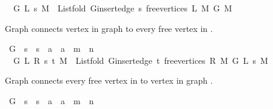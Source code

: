 \begin{isabellebody}
\ \ {\isachardoublequoteopen}G{}{\isacharunderscore}{\kern0pt}{}\ L\ s\ M\ {\isasymequiv}\ List{\isachardot}{\kern0pt}fold\ {\isacharparenleft}{\kern0pt}G{\isachardot}{\kern0pt}insert{\isacharunderscore}{\kern0pt}edge\ s{\isacharparenright}{\kern0pt}\ {\isacharparenleft}{\kern0pt}free{\isacharunderscore}{\kern0pt}vertices\ L\ M{\isacharparenright}{\kern0pt}\ {\isacharparenleft}{\kern0pt}G{}{\isacharunderscore}{\kern0pt}{}\ M{\isacharparenright}{\kern0pt}{\isachardoublequoteclose}%
\begin{isamarkuptext}%
Graph  connects vertex  in graph  to every free vertex in
.%
\end{isamarkuptext}\isamarkuptrue%
\isamarkupfalse%
\ G{}{\isacharunderscore}{\kern0pt}{}\ {\isacharcolon}{\kern0pt}{\isacharcolon}{\kern0pt}\ {\isachardoublequoteopen}{\isacharprime}{\kern0pt}s\ {\isasymRightarrow}\ {\isacharprime}{\kern0pt}s\ {\isasymRightarrow}\ {\isacharprime}{\kern0pt}a\ {\isasymRightarrow}\ {\isacharprime}{\kern0pt}a\ {\isasymRightarrow}\ {\isacharprime}{\kern0pt}m\ {\isasymRightarrow}\ {\isacharprime}{\kern0pt}n{\isachardoublequoteclose}\ \isanewline
\ \ {\isachardoublequoteopen}G{}{\isacharunderscore}{\kern0pt}{}\ L\ R\ s\ t\ M\ {\isasymequiv}\ List{\isachardot}{\kern0pt}fold\ {\isacharparenleft}{\kern0pt}G{\isachardot}{\kern0pt}insert{\isacharunderscore}{\kern0pt}edge\ t{\isacharparenright}{\kern0pt}\ {\isacharparenleft}{\kern0pt}free{\isacharunderscore}{\kern0pt}vertices\ R\ M{\isacharparenright}{\kern0pt}\ {\isacharparenleft}{\kern0pt}G{}{\isacharunderscore}{\kern0pt}{}\ L\ s\ M{\isacharparenright}{\kern0pt}{\isachardoublequoteclose}%
\begin{isamarkuptext}%
Graph  connects every free vertex in  to vertex  in graph
.%
\end{isamarkuptext}\isamarkuptrue%
\isamarkupfalse%
\ G{}\ {\isacharcolon}{\kern0pt}{\isacharcolon}{\kern0pt}\ {\isachardoublequoteopen}{\isacharprime}{\kern0pt}s\ {\isasymRightarrow}\ {\isacharprime}{\kern0pt}s\ {\isasymRightarrow}\ {\isacharprime}{\kern0pt}a\ {\isasymRightarrow}\ {\isacharprime}{\kern0pt}a\ {\isasymRightarrow}\ {\isacharprime}{\kern0pt}m\ {\isasymRightarrow}\ {\isacharprime}{\kern0pt}n{\isachardoublequoteclose}\ \isanewline

\end{isabellebody}
